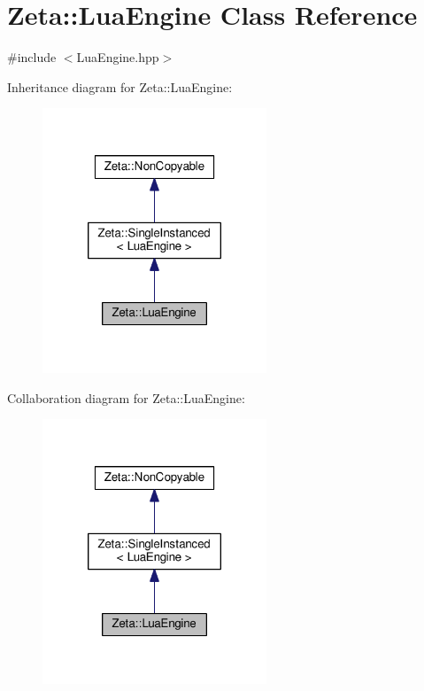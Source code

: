 \hypertarget{classZeta_1_1LuaEngine}{\section{Zeta\+:\+:Lua\+Engine Class Reference}
\label{classZeta_1_1LuaEngine}
}


{\ttfamily \#include $<$Lua\+Engine.\+hpp$>$}



Inheritance diagram for Zeta\+:\+:Lua\+Engine\+:\nopagebreak
\begin{figure}[H]
\begin{center}
\leavevmode
\includegraphics[width=190pt]{classZeta_1_1LuaEngine__inherit__graph}
\end{center}
\end{figure}


Collaboration diagram for Zeta\+:\+:Lua\+Engine\+:\nopagebreak
\begin{figure}[H]
\begin{center}
\leavevmode
\includegraphics[width=190pt]{classZeta_1_1LuaEngine__coll__graph}
\end{center}
\end{figure}

